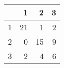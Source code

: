 \begin{tabular}{rrrr}
  \hline
 & 1 & 2 & 3 \\ 
  \hline
1 &  21 &   1 &   2 \\ 
  2 &   0 &  15 &   9 \\ 
  3 &   2 &   4 &   6 \\ 
   \hline
\end{tabular}
